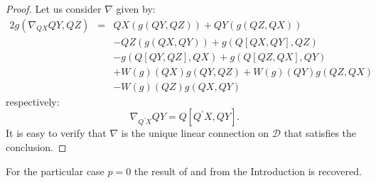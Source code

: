 \documentclass[11pt,oneside,english]{amsart}
\numberwithin{equation}{section}
\numberwithin{figure}{section}
\theoremstyle{plain}
\theoremstyle{definition}
\theoremstyle{definition}
\theoremstyle{plain}
\theoremstyle{plain}
\theoremstyle{remark}
\theoremstyle{remark}
\begin{document}
\begin{proof}
Let us consider $\nabla$ given by: \begin{eqnarray}
2g\left(\nabla_{QX}QY,QZ\right) & = & QX\left(g\left(QY,QZ\right)\right)+QY\left(g\left(QZ,QX\right)\right)\nonumber \\
 &  & -QZ\left(g\left(QX,QY\right)\right)+g\left(Q\left[QX,QY\right],QZ\right)\nonumber \\
 &  & -g\left(Q\left[QY,QZ\right],QX\right)+g\left(Q\left[QZ,QX\right],QY\right)\nonumber \\
 &  & +W\left(g\right)\left(QX\right)g\left(QY,QZ\right)+W\left(g\right)\left(QY\right)g\left(QZ,QX\right)\nonumber \\
 &  & -W\left(g\right)\left(QZ\right)g\left(QX,QY\right)\label{eq:6}\end{eqnarray}
 respectively: \begin{equation}
\nabla_{Q^{\prime}X}QY=Q\left[Q^{\prime}X,QY\right].\label{eq:7}\end{equation}
 It is easy to verify that $\nabla$ is the unique linear connection
on $\mathcal{D}$ that satisfies the conclusion. 
\end{proof}
\medskip{}

For the particular case $p=0$ the result of \cite{f:l} and \cite{Sen}
from the Introduction is recovered.

\medskip{}
\end{document}
